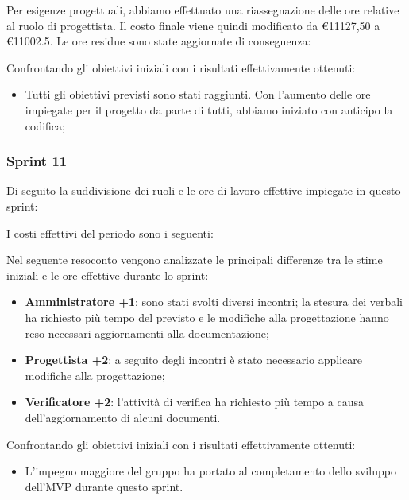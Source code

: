 Per esigenze progettuali, abbiamo effettuato una riassegnazione delle ore relative al ruolo di progettista. Il costo finale viene quindi modificato da \euro{11127,50} a \euro{11002.5}. Le ore residue sono state aggiornate di conseguenza:



Confrontando gli obiettivi iniziali con i risultati effettivamente ottenuti:
\begin{itemize}
\item Tutti gli obiettivi previsti sono stati raggiunti. Con l'aumento delle ore impiegate per il progetto da parte di tutti, abbiamo iniziato con anticipo la codifica;
\end{itemize}

\pagebreak

\subsubsection{Sprint 11}

Di seguito la suddivisione dei ruoli e le ore di lavoro effettive impiegate in questo sprint:



I costi effettivi del periodo sono i seguenti:



Nel seguente resoconto vengono analizzate le principali differenze tra le stime iniziali e le ore effettive durante lo sprint:
\begin{itemize}
    \item \textbf{Amministratore +1}: sono stati svolti diversi incontri; la stesura dei verbali ha richiesto più tempo del previsto e le modifiche alla progettazione hanno reso necessari aggiornamenti alla documentazione;
    \item \textbf{Progettista +2}: a seguito degli incontri è stato necessario applicare modifiche alla progettazione;
    \item \textbf{Verificatore +2}: l'attività di verifica ha richiesto più tempo a causa dell'aggiornamento di alcuni documenti.
\end{itemize}




Confrontando gli obiettivi iniziali con i risultati effettivamente ottenuti:
\begin{itemize}
\item L'impegno maggiore del gruppo ha portato al completamento dello sviluppo dell'MVP durante questo sprint.
\end{itemize}

